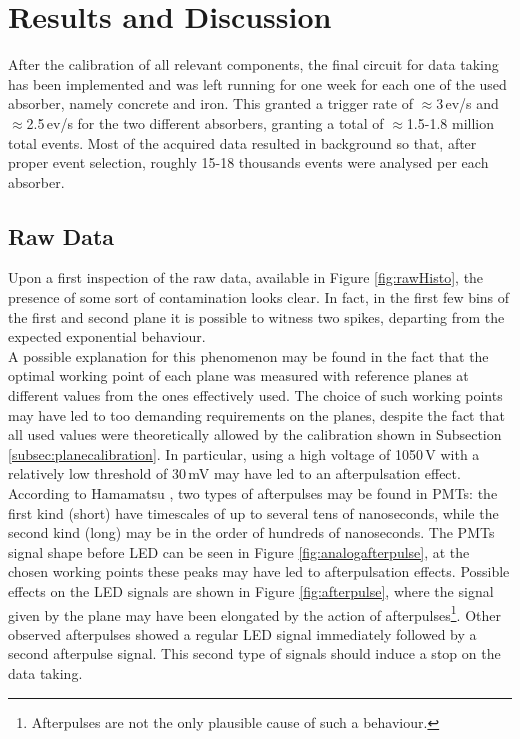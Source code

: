 \documentclass[../main.tex]{subfiles}
\begin{document}
\section{Results and Discussion} \label{sec:res} 

After the calibration of all relevant components, the final circuit for data taking has been implemented and was left running for one week for each one of the used absorber, namely concrete and iron. This granted a trigger rate of $\approx$3\,ev/s and $\approx$2.5\,ev/s for the two different absorbers, granting a total of $\approx$1.5-1.8 million total events. Most of the acquired data resulted in background so that, after proper event selection, roughly 15-18 thousands events were analysed per each absorber.

\subsection{Raw Data}
Upon a first inspection of the raw data, available in Figure \ref{fig:rawHisto}, the presence of some sort of contamination looks clear. In fact, in the first few bins of the first and second plane it is possible to witness two spikes, departing from the expected exponential behaviour.\\

A possible explanation for this phenomenon may be found in the fact that the optimal working point of each plane was measured with reference planes at different values from the ones effectively used. 
The choice of such working points may have led to too demanding requirements on the planes, despite the fact that all used values were theoretically allowed by the calibration shown in Subsection \ref{subsec:planecalibration}. In particular, using a high voltage of 1050\,V with a relatively low threshold of 30\,mV may have led to an afterpulsation effect. According to Hamamatsu \cite{hamamatsu2017pmt}, two types of afterpulses may be found in PMTs: the first kind (short) have timescales of up to several tens of nanoseconds, while the second kind (long) may be in the order of hundreds of nanoseconds.
The PMTs signal shape before LED can be seen in Figure \ref{fig:analogafterpulse}, at the chosen working points these peaks may have led to afterpulsation effects. Possible effects on the LED signals are shown in Figure \ref{fig:afterpulse}, where the signal given by the plane may have been elongated by the action of afterpulses\footnote{Afterpulses are not the only plausible cause of such a behaviour.}. Other observed afterpulses showed a regular LED signal immediately followed by a second afterpulse signal. This second type of signals should induce a stop on the data taking.\\
\end{document}

